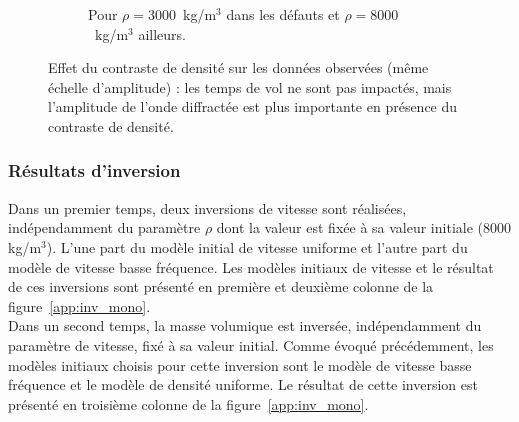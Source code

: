 \begin{figure}[!h]
\begin{subfigure}[b]{0.45\textwidth}
		\caption{Pour $\rho=3000$~kg/m$^{3}$ dans les défauts et $\rho=8000$~kg/m$^{3}$ ailleurs.}
	\end{subfigure}
	\caption{Effet du contraste de densité sur les données observées (même échelle d'amplitude) : les temps de vol ne sont pas impactés, mais l'amplitude de l'onde diffractée est plus importante en présence du contraste de densité. \label{app:traces_rho}}	
\end{figure}

\subsubsection{Résultats d'inversion}

Dans un premier temps, deux inversions de vitesse sont réalisées, indépendamment du paramètre $\rho$ dont la valeur est fixée à sa valeur initiale (8000 kg/m$^{3}$). L'une part du modèle initial de vitesse uniforme  et l'autre part du modèle de vitesse basse fréquence. Les modèles initiaux de vitesse et le résultat de ces inversions sont présenté en première et deuxième colonne de la figure~\ref{app:inv_mono}.\\

Dans un second temps, la masse volumique est inversée, indépendamment du paramètre de vitesse, fixé à sa valeur initial. Comme évoqué précédemment, les modèles initiaux choisis pour cette inversion sont le modèle de vitesse basse fréquence et le modèle de densité uniforme. Le résultat de cette inversion est présenté en troisième colonne de la figure~\ref{app:inv_mono}. 


